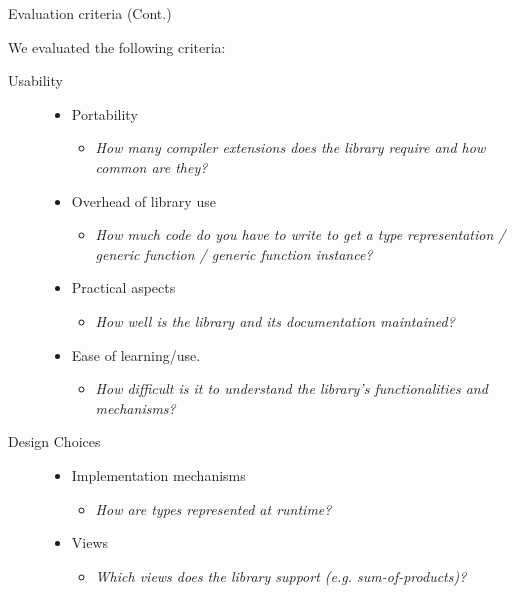 \documentclass[10pt]{beamer}
\begin{document}
\begin{frame}{Evaluation criteria (Cont.)}
	
	We evaluated the following criteria:
\begin{description}
\item[Usability]
\begin{itemize}
\item Portability
\begin{itemize}
\item \textit{How many compiler extensions does the library require and how common are they?}
\end{itemize}
\item Overhead of library use
\begin{itemize}
\item \textit{How much code do you have to write to get a type representation / generic function / generic function instance?}
\end{itemize}
\item Practical aspects
\begin{itemize}
\item \textit{How well is the library and its documentation maintained?}
\end{itemize}
\item Ease of learning/use.
\begin{itemize}
\item \textit{How difficult is it to understand the library's functionalities and mechanisms?}
\end{itemize}
\end{itemize}
\end{description}

\begin{description}
\item[Design Choices]
\begin{itemize}
\item Implementation mechanisms
\begin{itemize}
\item \textit{How are types represented at runtime?}
\end{itemize}
\item Views
\begin{itemize}
\item \textit{Which views does the library support (e.g. sum-of-products)?}
\end{itemize}
\end{itemize}
\end{description}

\end{frame}
\end{document}
